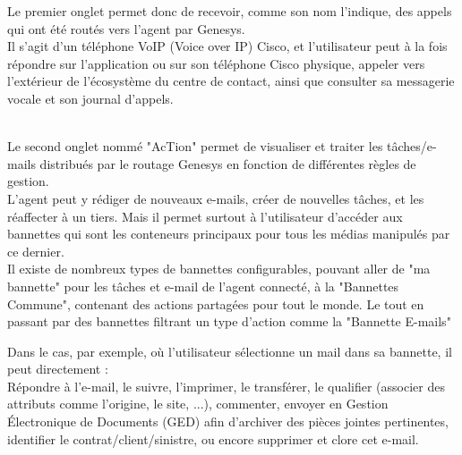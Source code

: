\documentclass{rapport}
\begin{document}
\vspace{5mm} %
\begin{minipage}{0.65\textwidth}
Le premier onglet permet donc de recevoir, comme son nom l'indique, des appels qui ont été routés vers l'agent par Genesys. \\

Il s'agit d'un téléphone VoIP (Voice over IP) Cisco, et l'utilisateur peut à la fois répondre sur l'application ou sur son téléphone Cisco physique, appeler vers l'extérieur de l'écosystème du centre de contact, ainsi que consulter sa messagerie vocale et son journal d'appels.\\

\end{minipage}
\begin{minipage}{0.25\textwidth}
\end{minipage}
\vspace{5mm} %
\noindent
\\

Le second onglet nommé "AcTion" permet de visualiser et traiter les tâches/e-mails distribués par le routage Genesys en fonction de différentes règles de gestion.\\

L'agent peut y rédiger de nouveaux e-mails, créer de nouvelles tâches, et les réaffecter à un tiers. Mais il permet surtout à l'utilisateur d'accéder aux bannettes qui sont les conteneurs principaux pour tous les médias manipulés par ce dernier. \\
Il existe de nombreux types de bannettes configurables, pouvant aller de "ma bannette" pour les tâches et e-mail de l'agent connecté, à la "Bannettes Commune", contenant des actions partagées pour tout le monde. Le tout en passant par des bannettes filtrant un type d'action comme la "Bannette E-mails"\\



Dans le cas, par exemple, où l'utilisateur sélectionne un mail dans sa bannette, il peut directement :\\
Répondre à l'e-mail, le suivre, l'imprimer, le transférer, le qualifier (associer des attributs comme l'origine, le site, ...), commenter, envoyer en Gestion Électronique de Documents (GED) afin d'archiver des pièces jointes pertinentes, identifier le contrat/client/sinistre, ou encore supprimer et clore cet e-mail.\\
\end{document}
